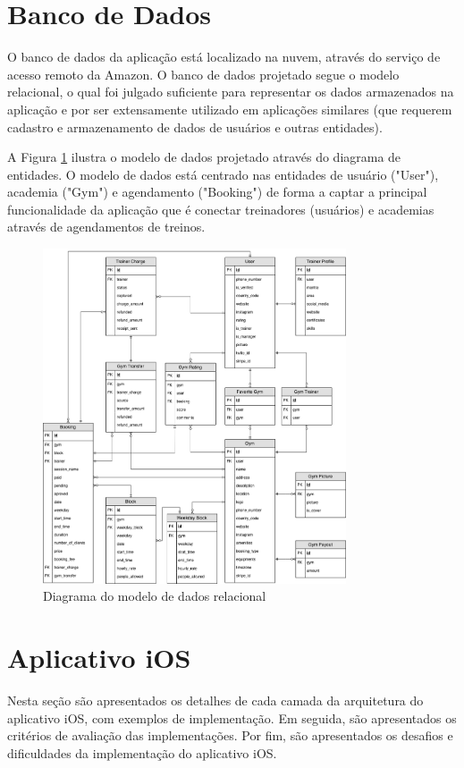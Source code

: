 \section{Banco de Dados}
O banco de dados da aplicação está localizado na nuvem, através do serviço de acesso remoto da Amazon. O banco de dados projetado segue o modelo relacional, o qual foi julgado suficiente para representar os dados armazenados na aplicação e por ser extensamente utilizado em aplicações similares (que requerem cadastro e armazenamento de dados de usuários e outras entidades).

A Figura \ref{fig:database} ilustra o modelo de dados projetado através do diagrama de entidades. O modelo de dados está centrado nas entidades de usuário ("User"), academia ("Gym") e agendamento ("Booking") de forma a captar a principal funcionalidade da aplicação que é conectar treinadores (usuários) e academias através de agendamentos de treinos.

\begin{figure}[H]
    \centering
    \includegraphics[width=0.8\textwidth]{pfc/figuras/database-schema.png}
    \caption{Diagrama do modelo de dados relacional}
    \label{fig:database}
\end{figure}

\section{Aplicativo iOS}
Nesta seção são apresentados os detalhes de cada camada da arquitetura do aplicativo iOS, com exemplos de implementação. Em seguida, são apresentados os critérios de avaliação das implementações. Por fim, são apresentados os desafios e dificuldades da implementação do aplicativo iOS.


